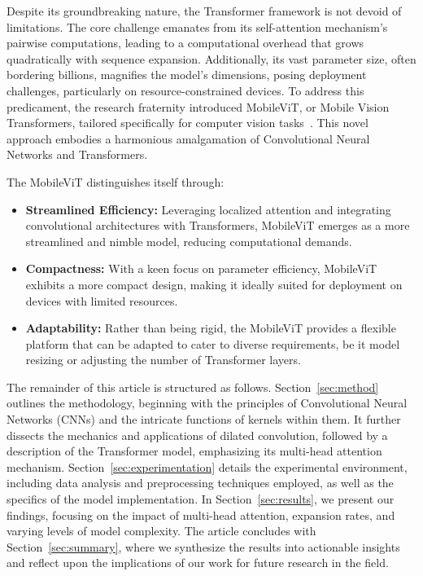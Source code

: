 \documentclass[10pt,twocolumn,letterpaper]{article}
\begin{document}
Despite its groundbreaking nature, the Transformer framework is not devoid of limitations. The core challenge emanates from its self-attention mechanism's pairwise computations, leading to a computational overhead that grows quadratically with sequence expansion. Additionally, its vast parameter size, often bordering billions, magnifies the model's dimensions, posing deployment challenges, particularly on resource-constrained devices. To address this predicament, the research fraternity introduced MobileViT, or Mobile Vision Transformers, tailored specifically for computer vision tasks~\cite{Mehta21,Cao23}. This novel approach embodies a harmonious amalgamation of Convolutional Neural Networks and Transformers.

The MobileViT distinguishes itself through:
\begin{itemize}
   \item \textbf{Streamlined Efficiency:} Leveraging localized attention and integrating convolutional architectures with Transformers, MobileViT emerges as a more streamlined and nimble model, reducing computational demands.
   \item \textbf{Compactness:} With a keen focus on parameter efficiency, MobileViT exhibits a more compact design, making it ideally suited for deployment on devices with limited resources.
   \item \textbf{Adaptability:} Rather than being rigid, the MobileViT provides a flexible platform that can be adapted to cater to diverse requirements, be it model resizing or adjusting the number of Transformer layers.
\end{itemize}

The remainder of this article is structured as follows. Section~\ref{sec:method} outlines the methodology, beginning with the principles of Convolutional Neural Networks (CNNs) and the intricate functions of kernels within them. It further dissects the mechanics and applications of dilated convolution, followed by a description of the Transformer model, emphasizing its multi-head attention mechanism. Section~\ref{sec:experimentation} details the experimental environment, including data analysis and preprocessing techniques employed, as well as the specifics of the model implementation. In Section~\ref{sec:results}, we present our findings, focusing on the impact of multi-head attention, expansion rates, and varying levels of model complexity. The article concludes with Section~\ref{sec:summary}, where we synthesize the results into actionable insights and reflect upon the implications of our work for future research in the field.
\end{document}
